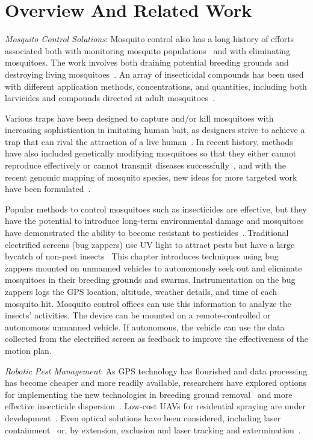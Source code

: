 \section[Overview And Related Work]{Overview And Related Work}

\noindent  \emph{Mosquito Control Solutions}:
Mosquito control also has a long history of efforts associated both with monitoring mosquito populations~\cite{dennett2007associations} and with eliminating mosquitoes.
The work involves both draining potential breeding grounds and destroying living mosquitoes~\cite{peter2005tick}.
An array of insecticidal compounds has been used with different application methods, concentrations, and quantities, including both larvicides and compounds directed at adult mosquitoes~\cite{larvicides2005guidelines}.

Various traps have been designed to capture and/or kill mosquitoes with increasing sophistication in imitating human bait, as designers strive to achieve a trap that can rival the attraction of a live human~\cite{maliti2015development}.
In recent history, methods have also included genetically modifying mosquitoes so that they either cannot reproduce effectively or cannot transmit diseases successfully~\cite{marshall2009malaria}, and with the recent genomic mapping of mosquito species, new ideas for more targeted work have been formulated~\cite{hill2005arthropod}.

Popular methods to control mosquitoes such as insecticides are effective, but they have the potential to introduce long-term environmental damage and mosquitoes have demonstrated the ability to become resistant to pesticides~\cite{ndiath2012resistance}.
Traditional electrified screens (bug zappers) use UV light to attract pests but have a large bycatch of non-pest insects~\cite{University-Of-Florida1997}
This chapter introduces techniques using bug zappers mounted on unmanned vehicles to autonomously seek out and eliminate mosquitoes in their breeding grounds and swarms.
Instrumentation on the bug zappers logs the GPS location, altitude, weather details, and time of each mosquito hit.
Mosquito control offices can use this information to analyze the insects' activities.
The device can be mounted on a remote-controlled or autonomous unmanned vehicle.
If autonomous, the vehicle can use the data collected from the electrified screen as feedback to improve the effectiveness of the motion plan. 
	
\noindent  \emph{Robotic Pest Management}:
As GPS technology has flourished and data processing has become cheaper and more readily available, researchers have explored options for implementing the new technologies in breeding ground removal~\cite{anupa2014identification} and more effective insecticide dispersion~\cite{hur2015low}.  Low-cost UAVs for residential spraying are under development~\cite{amenyo2014medizdroids}.  Even optical solutions have been considered, including laser containment~\cite{boonsri2012laser} or, by extension, exclusion and laser tracking and extermination~\cite{kare2010build}.
    
